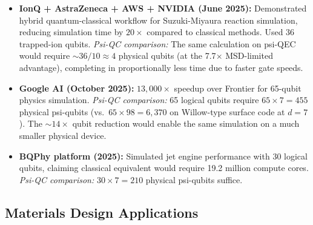 \documentclass[11pt]{article}
\theoremstyle{definition}
\theoremstyle{remark}
\begin{document}
\begin{itemize}
\item \textbf{IonQ + AstraZeneca + AWS + NVIDIA (June 2025):}
  Demonstrated hybrid quantum-classical workflow for Suzuki-Miyaura
  reaction simulation, reducing simulation time by $20\times$ compared
  to classical methods. Used 36 trapped-ion qubits.
  \emph{Psi-QC comparison:} The same calculation on psi-QEC would
  require $\sim 36/10 \approx 4$ physical qubits (at the
  7.7$\times$ MSD-limited advantage), completing in proportionally
  less time due to faster gate speeds.

\item \textbf{Google AI (October 2025):} $13{,}000\times$ speedup over
  Frontier for 65-qubit physics simulation.
  \emph{Psi-QC comparison:} 65 logical qubits require $65 \times 7 = 455$
  physical psi-qubits (vs.\ $65 \times 98 = 6{,}370$ on Willow-type
  surface code at $d = 7$). The $\sim 14\times$ qubit reduction would
  enable the same simulation on a much smaller physical device.

\item \textbf{BQPhy platform (2025):} Simulated jet engine performance
  with 30 logical qubits, claiming classical equivalent would require
  19.2 million compute cores.
  \emph{Psi-QC comparison:} $30 \times 7 = 210$ physical psi-qubits
  suffice.
\end{itemize}

\subsection{Materials Design Applications}
\label{sec:materials}
\end{document}
